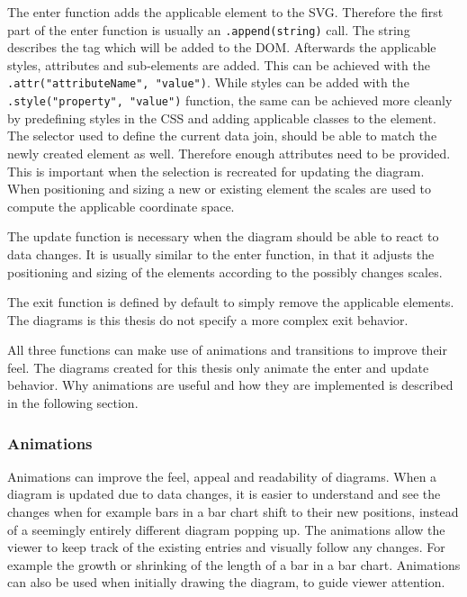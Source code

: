 The enter function adds the applicable element to the SVG. Therefore the first part of the enter function is usually an \texttt{.append(string)} call. The string describes the tag which will be added to the DOM. Afterwards the applicable styles, attributes and sub-elements are added. This can be achieved with the \texttt{.attr("attributeName", "value")}. While styles can be added with the \texttt{.style("property", "value")} function, the same can be achieved more cleanly by predefining styles in the CSS and adding applicable classes to the element. The selector used to define the current data join, should be able to match the newly created element as well. Therefore enough attributes need to be provided. This is important when the selection is recreated for updating the diagram. When positioning and sizing a new or existing element the scales are used to compute the applicable coordinate space.

The update function is necessary when the diagram should be able to react to data changes. It is usually similar to the enter function, in that it adjusts the positioning and sizing of the elements according to the possibly changes scales. 

The exit function is defined by default to simply remove the applicable elements. The diagrams is this thesis do not specify a more complex exit behavior.

All three functions can make use of animations and transitions to improve their feel. The diagrams created for this thesis only animate the enter and update behavior. Why animations are useful and how they are implemented is described in the following section.

\subsubsection{Animations}

Animations can improve the feel, appeal and readability of diagrams. When a diagram is updated due to data changes, it is easier to understand and see the changes when for example bars in a bar chart shift to their new positions, instead of a seemingly entirely different diagram popping up. The animations allow the viewer to keep track of the existing entries and visually follow any changes. For example the growth or shrinking of the length of a bar in a bar chart. Animations can also be used when initially drawing the diagram, to guide viewer attention.

